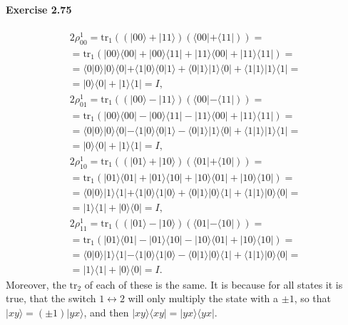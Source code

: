 \documentclass[a4paper,12pt]{article}
\newcommand{\exercise}[1]{\paragraph{Exercise #1}}
\newcommand{\la}{\langle}
\newcommand{\ra}{\rangle}
\begin{document}
    \exercise{2.75}
    \begin{gather}
        \nonumber
        2 \rho_{00}^1 = \textrm{tr}_1 ( ( | 00 \ra + | 11 \ra ) ( \la 00 | + \la 11 | ) ) =\\
        \nonumber
        = \textrm{tr}_1 ( | 00 \ra \la 00 | + | 00 \ra \la 11 | + | 11 \ra \la 00 | + | 11 \ra \la 11 | ) =\\
        \nonumber
        = \la 0 | 0 \ra | 0 \ra \la 0 | + \la 1 | 0 \ra \la 0 | 1 \ra + \la 0 | 1 \ra | 1 \ra \la 0 | + \la 1 | 1 \ra | 1 \ra \la 1 | =\\
        \nonumber
        = | 0 \ra \la 0 | + | 1 \ra \la 1 | = I \textrm{,} \\
        \nonumber
        2 \rho_{01}^1 = \textrm{tr}_1 ( ( | 00 \ra - | 11 \ra ) ( \la 00 | - \la 11 | ) ) =\\
        \nonumber
        = \textrm{tr}_1 ( | 00 \ra \la 00 | - | 00 \ra \la 11 | - | 11 \ra \la 00 | + | 11 \ra \la 11 | ) =\\
        \nonumber
        = \la 0 | 0 \ra | 0 \ra \la 0 | - \la 1 | 0 \ra \la 0 | 1 \ra - \la 0 | 1 \ra | 1 \ra \la 0 | + \la 1 | 1 \ra | 1 \ra \la 1 | =\\
        \nonumber
        = | 0 \ra \la 0 | + | 1 \ra \la 1 | = I \textrm{,} \\
        \nonumber
        2 \rho_{10}^1 = \textrm{tr}_1 ( ( | 01 \ra + | 10 \ra ) ( \la 01 | + \la 10 | ) ) =\\
        \nonumber
        = \textrm{tr}_1 ( | 01 \ra \la 01 | + | 01 \ra \la 10 | + | 10 \ra \la 01 | + | 10 \ra \la 10 | ) =\\
        \nonumber
        = \la 0 | 0 \ra | 1 \ra \la 1 | + \la 1 | 0 \ra \la 1 | 0 \ra + \la 0 | 1 \ra | 0 \ra \la 1 | + \la 1 | 1 \ra | 0 \ra \la 0 | =\\
        \nonumber
        = | 1 \ra \la 1 | + | 0 \ra \la 0 | = I \textrm{,} \\
        \nonumber
        2 \rho_{11}^1 = \textrm{tr}_1 ( ( | 01 \ra - | 10 \ra ) ( \la 01 | - \la 10 | ) ) =\\
        \nonumber
        = \textrm{tr}_1 ( | 01 \ra \la 01 | - | 01 \ra \la 10 | - | 10 \ra \la 01 | + | 10 \ra \la 10 | ) =\\
        \nonumber
        = \la 0 | 0 \ra | 1 \ra \la 1 | - \la 1 | 0 \ra \la 1 | 0 \ra - \la 0 | 1 \ra | 0 \ra \la 1 | + \la 1 | 1 \ra | 0 \ra \la 0 | =\\
        = | 1 \ra \la 1 | + | 0 \ra \la 0 | = I \textrm{.}
    \end{gather}
    Moreover, the $\textrm{tr}_2$ of each of these is the same. It is because for all states it is true, that the switch $1 \leftrightarrow 2$ will only multiply the state with a $\pm 1$, so that $|xy \ra = (\pm 1)|yx \ra$, and then $| xy \ra \la xy | = |yx \ra \la yx |$.
\end{document}
